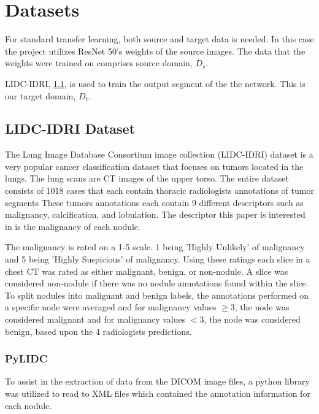 \documentclass[10pt,twocolumn,letterpaper]{article}
\begin{document}
\section{Datasets} \label{sec:data}
   For standard transfer learning, both source and target data is needed. In this case
   the project utilizes ResNet 50's weights of the source images. The data that the weights
   were trained on comprises source domain, $D_s$.

   LIDC-IDRI, \ref{sec:data-lidc}, is used to train the output segment of the
   the network. This is our target domain, $D_t$.

   \subsection{LIDC-IDRI Dataset} \label{sec:data-lidc}
      The Lung Image Database Consortium image collection (LIDC-IDRI) dataset
      is a very popular cancer classification dataset that focuses on tumors located
      in the lungs. The lung scans are CT images of the upper torso. The entire dataset
      consists of 1018 cases that each contain thoracic radiologists annotations of tumor segments
      These tumors annotations each contain 9 different descriptors such as malignancy,
      calcification, and lobulation. The descriptor this paper is interested in is the
      malignancy of each nodule.

      The malignancy is rated on a 1-5 scale. 1 being 'Highly Unlikely' of malignancy and
      5 being 'Highly Suspicious' of malignancy. Using these ratings each slice in a chest CT
      was rated as either malignant, benign, or non-nodule. A slice was considered non-nodule
      if there was no nodule annotations found within the slice. To split nodules into malignant
      and benign labels, the annotations performed on a specific node were averaged and for malignancy
      values $\ge 3$, the node was considered malignant and for malignancy values $< 3$, the node was
      considered benign, based upon the 4 radiologists predictions.
    
      \subsubsection{PyLIDC} \label{sec:data-lidc-pylidc}
         To assist in the extraction of data from the DICOM image files, a python library was utilized
         to read to XML files which contained the annotation information for each nodule. \cite{Hancock2018}
    
\end{document}
